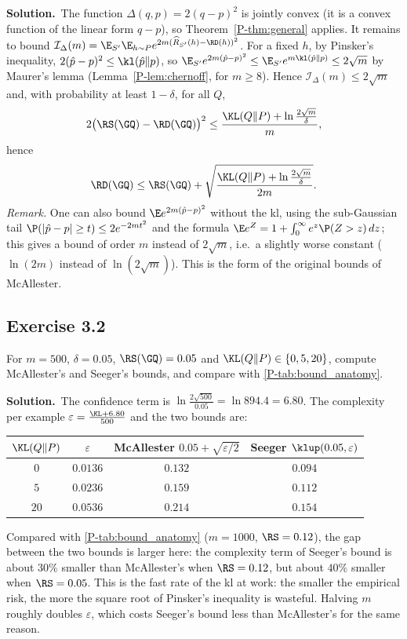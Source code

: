 \documentclass[11pt]{article}
\newcommand{\statement}[1]{\begin{tcolorbox}[enhanced,breakable,colback=black!3,colframe=black!25,boxrule=0.4pt,sharp corners,fontupper=\itshape\small]#1\end{tcolorbox}}
\newcommand{\exo}[1]{\Needspace{6\baselineskip}\subsection*{Exercise #1}\addcontentsline{toc}{subsection}{Exercise #1}}
\newcommand{\sol}{\noindent\textbf{Solution.}\ }
\begin{document}
\sol The function $\Delta(q,p)=2(q-p)^2$ is jointly convex (it is a convex function of the linear form $q-p$), so
Theorem~\ref{P-thm:general} applies. It remains to bound $\mathcal I_\Delta(m)=\E_{S'}\E_{h\sim P}e^{2m(\widehat R_{S'}(h)-\RD(h))^2}$.
For a fixed $h$, by Pinsker's inequality, $2(\hat p-p)^2\leq\kl(\hat p\|p)$, so
$\E_{S'}e^{2m(\hat p-p)^2}\leq\E_{S'}e^{m\kl(\hat p\|p)}\leq2\sqrt m$ by Maurer's lemma (Lemma~\ref{P-lem:chernoff}, for $m\geq8$).
Hence $\mathcal I_\Delta(m)\leq2\sqrt m$ and, with probability at least $1-\delta$, for all $Q$,
\[
2\big(\RS(\GQ)-\RD(\GQ)\big)^2\leq\frac{\KL(Q\|P)+\ln\frac{2\sqrt m}{\delta}}{m},
\]
hence
\[
\RD(\GQ)\leq\RS(\GQ)+\sqrt{\frac{\KL(Q\|P)+\ln\frac{2\sqrt m}{\delta}}{2m}}.
\]
\emph{Remark.} One can also bound $\E e^{2m(\hat p-p)^2}$ without the kl, using the sub-Gaussian tail
$\P(|\hat p-p|\geq t)\leq2e^{-2mt^2}$ and the formula $\E e^{Z}=1+\int_0^\infty e^z\P(Z>z)\,dz$; this gives a bound of order
$m$ instead of $2\sqrt m$, i.e.\ a slightly worse constant ($\ln(2m)$ instead of $\ln(2\sqrt m)$). This is the form of the
original bounds of McAllester.

\exo{3.2}
\statement{For $m=500$, $\delta=0.05$, $\RS(\GQ)=0.05$ and $\KL(Q\|P)\in\{0,5,20\}$, compute McAllester's and Seeger's bounds,
and compare with \cref{P-tab:bound_anatomy}.}

\sol The confidence term is $\ln\frac{2\sqrt{500}}{0.05}=\ln894.4=6.80$. The complexity per example
$\varepsilon=\frac{\KL+6.80}{500}$ and the two bounds are:
\begin{center}\small
\begin{tabular}{cccc}
\toprule
$\KL(Q\|P)$ & $\varepsilon$ & McAllester $0.05+\sqrt{\varepsilon/2}$ & Seeger $\klup(0.05,\varepsilon)$ \\
\midrule
$0$ & $0.0136$ & $0.132$ & $0.094$ \\
$5$ & $0.0236$ & $0.159$ & $0.112$ \\
$20$ & $0.0536$ & $0.214$ & $0.154$ \\
\bottomrule
\end{tabular}
\end{center}
Compared with \cref{P-tab:bound_anatomy} ($m=1000$, $\RS=0.12$), the gap between the two bounds is larger here: the
complexity term of Seeger's bound is about $30\%$ smaller than McAllester's when $\RS=0.12$, but about $40\%$ smaller when
$\RS=0.05$. This is the fast rate of the kl at work: the smaller the empirical risk, the more the square root of
Pinsker's inequality is wasteful. Halving $m$ roughly doubles $\varepsilon$, which costs Seeger's bound less than
McAllester's for the same reason.
\end{document}
